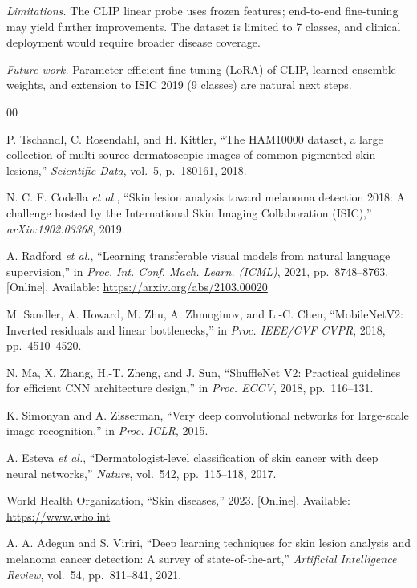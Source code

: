 \documentclass[conference]{IEEEtran}
\begin{document}
\textit{Limitations.} The CLIP linear probe uses frozen features;
end-to-end fine-tuning may yield further improvements. The dataset is
limited to 7 classes, and clinical deployment would require broader
disease coverage.

\textit{Future work.} Parameter-efficient fine-tuning (LoRA) of CLIP,
learned ensemble weights, and extension to ISIC 2019 (9 classes) are
natural next steps.

\begin{thebibliography}{00}

P. Tschandl, C. Rosendahl, and H. Kittler,
``The HAM10000 dataset, a large collection of multi-source
dermatoscopic images of common pigmented skin lesions,''
\textit{Scientific Data}, vol.~5, p.~180161, 2018.

N. C. F. Codella \textit{et al.},
``Skin lesion analysis toward melanoma detection 2018: A challenge
hosted by the International Skin Imaging Collaboration (ISIC),''
\textit{arXiv:1902.03368}, 2019.

A. Radford \textit{et al.},
``Learning transferable visual models from natural language
supervision,''
in \textit{Proc. Int. Conf. Mach. Learn. (ICML)}, 2021,
pp.~8748--8763. [Online]. Available: \url{https://arxiv.org/abs/2103.00020}

M. Sandler, A. Howard, M. Zhu, A. Zhmoginov, and L.-C. Chen,
``MobileNetV2: Inverted residuals and linear bottlenecks,''
in \textit{Proc. IEEE/CVF CVPR}, 2018, pp.~4510--4520.

N. Ma, X. Zhang, H.-T. Zheng, and J. Sun,
``ShuffleNet V2: Practical guidelines for efficient CNN architecture
design,''
in \textit{Proc. ECCV}, 2018, pp.~116--131.

K. Simonyan and A. Zisserman,
``Very deep convolutional networks for large-scale image recognition,''
in \textit{Proc. ICLR}, 2015.

A. Esteva \textit{et al.},
``Dermatologist-level classification of skin cancer with deep neural
networks,''
\textit{Nature}, vol.~542, pp.~115--118, 2017.

World Health Organization, ``Skin diseases,'' 2023.
[Online]. Available: \url{https://www.who.int}

A. A. Adegun and S. Viriri,
``Deep learning techniques for skin lesion analysis and melanoma cancer
detection: A survey of state-of-the-art,''
\textit{Artificial Intelligence Review}, vol.~54, pp.~811--841, 2021.


\end{thebibliography}
\end{document}
